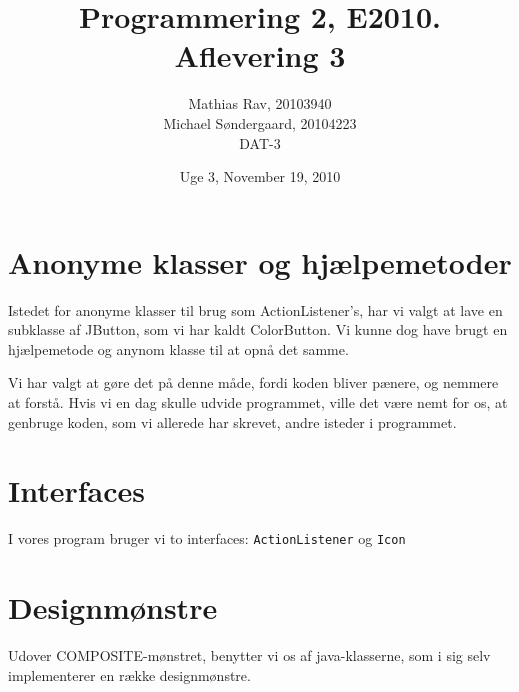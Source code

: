 \documentclass[12pt,a4paper]{article}
\begin{document}
\title{Programmering 2, E2010. Aflevering 3}
\author{Mathias Rav, 20103940 \\
		Michael Søndergaard, 20104223 \\
		DAT-3}
\date{Uge 3, November 19, 2010}
\maketitle


\section{Anonyme klasser og hjælpemetoder}
Istedet for anonyme klasser til brug som ActionListener's, har vi valgt at 
lave en subklasse af JButton, som vi har kaldt ColorButton. Vi kunne dog 
have brugt en hjælpemetode og anynom klasse til at opnå det samme.

Vi har valgt at gøre det på denne måde, fordi koden bliver pænere, og nemmere
at forstå. Hvis vi en dag skulle udvide programmet, ville det være nemt for os,
at genbruge koden, som vi allerede har skrevet, andre isteder i programmet. 

\section{Interfaces}
I vores program bruger vi to interfaces: \texttt{ActionListener} og \texttt{Icon} 

\section{Designmønstre}
Udover COMPOSITE-mønstret, benytter vi os af java-klasserne, som i sig selv 
implementerer en række designmønstre.
\end{document}
